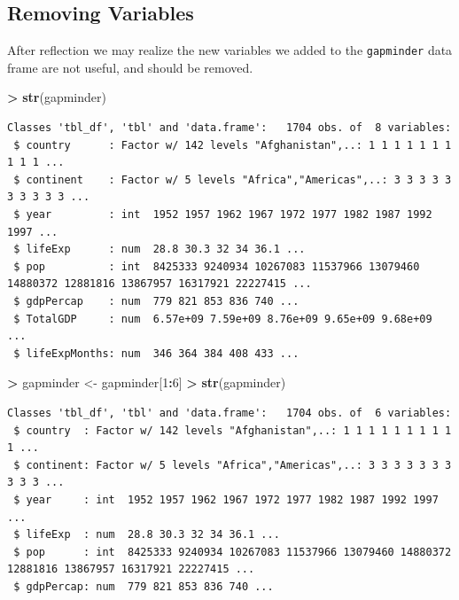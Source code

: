 \documentclass[]{krantz}
\makeatletter
\newenvironment{Shaded}{\begin{snugshade}}{\end{snugshade}}
\newcommand{\KeywordTok}[1]{\textcolor[rgb]{0.27,0.27,0.27}{\textbf{#1}}}
\newcommand{\DecValTok}[1]{\textcolor[rgb]{0.06,0.06,0.06}{#1}}
\newcommand{\StringTok}[1]{\textcolor[rgb]{0.5,0.5,0.5}{#1}}
\newcommand{\OperatorTok}[1]{\textcolor[rgb]{0.43,0.43,0.43}{\textbf{#1}}}
\newcommand{\NormalTok}[1]{#1}
\newenvironment{kframe}{%
\medskip{}
\setlength{\fboxsep}{.8em}
 \def\at@end@of@kframe{}%
 \ifinner\ifhmode%
  \def\at@end@of@kframe{\end{minipage}}%
  \begin{minipage}{\columnwidth}%
 \fi\fi%
 \def\FrameCommand##1{\hskip\@totalleftmargin \hskip-\fboxsep
 \colorbox{shadecolor}{##1}\hskip-\fboxsep
     \hskip-\linewidth \hskip-\@totalleftmargin \hskip\columnwidth}%
 \MakeFramed {\advance\hsize-\width
   \@totalleftmargin\z@ \linewidth\hsize
   \@setminipage}}%
 {\par\unskip\endMakeFramed%
 \at@end@of@kframe}
\renewenvironment{Shaded}{\begin{kframe}}{\end{kframe}}
\makeatother
\begin{document}
\subsection{Removing Variables}\label{removing-variables}

After reflection we may realize the new variables we added to the
\texttt{gapminder} data frame are not useful, and should be removed.

\begin{Shaded}
\begin{Highlighting}[]
\OperatorTok{>}\StringTok{ }\KeywordTok{str}\NormalTok{(gapminder)}
\end{Highlighting}
\end{Shaded}

\begin{verbatim}
Classes 'tbl_df', 'tbl' and 'data.frame':   1704 obs. of  8 variables:
 $ country      : Factor w/ 142 levels "Afghanistan",..: 1 1 1 1 1 1 1 1 1 1 ...
 $ continent    : Factor w/ 5 levels "Africa","Americas",..: 3 3 3 3 3 3 3 3 3 3 ...
 $ year         : int  1952 1957 1962 1967 1972 1977 1982 1987 1992 1997 ...
 $ lifeExp      : num  28.8 30.3 32 34 36.1 ...
 $ pop          : int  8425333 9240934 10267083 11537966 13079460 14880372 12881816 13867957 16317921 22227415 ...
 $ gdpPercap    : num  779 821 853 836 740 ...
 $ TotalGDP     : num  6.57e+09 7.59e+09 8.76e+09 9.65e+09 9.68e+09 ...
 $ lifeExpMonths: num  346 364 384 408 433 ...
\end{verbatim}

\begin{Shaded}
\begin{Highlighting}[]
\OperatorTok{>}\StringTok{ }\NormalTok{gapminder <-}\StringTok{ }\NormalTok{gapminder[}\DecValTok{1}\OperatorTok{:}\DecValTok{6}\NormalTok{]}
\OperatorTok{>}\StringTok{ }\KeywordTok{str}\NormalTok{(gapminder)}
\end{Highlighting}
\end{Shaded}

\begin{verbatim}
Classes 'tbl_df', 'tbl' and 'data.frame':   1704 obs. of  6 variables:
 $ country  : Factor w/ 142 levels "Afghanistan",..: 1 1 1 1 1 1 1 1 1 1 ...
 $ continent: Factor w/ 5 levels "Africa","Americas",..: 3 3 3 3 3 3 3 3 3 3 ...
 $ year     : int  1952 1957 1962 1967 1972 1977 1982 1987 1992 1997 ...
 $ lifeExp  : num  28.8 30.3 32 34 36.1 ...
 $ pop      : int  8425333 9240934 10267083 11537966 13079460 14880372 12881816 13867957 16317921 22227415 ...
 $ gdpPercap: num  779 821 853 836 740 ...
\end{verbatim}
\end{document}
